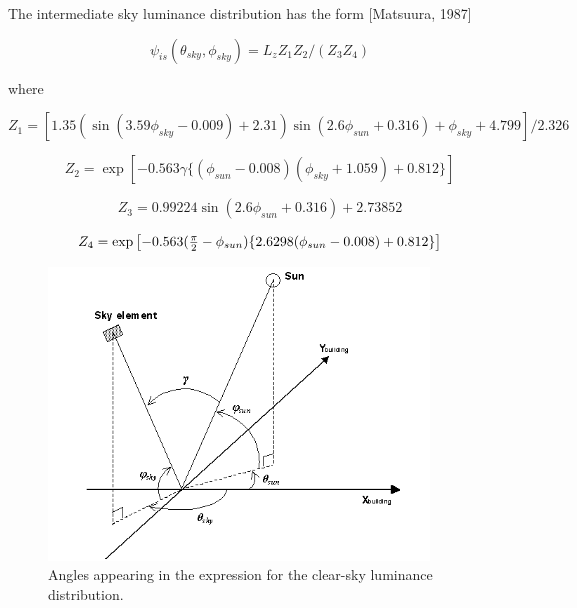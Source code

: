 The intermediate sky luminance distribution has the form {[}Matsuura, 1987{]}

\begin{equation}
{\psi_{is}}\left( {{\theta_{sky}},{\phi_{sky}}} \right) = {L_z}{Z_1}{Z_2}/({Z_3}{Z_4})
\end{equation}

where

\begin{equation}
{Z_1} = \left[ {1.35(\sin (3.59{\phi_{sky}} - 0.009) + 2.31)\sin (2.6{\phi_{sun}} + 0.316) + {\phi_{sky}} + 4.799} \right]/2.326 
\end{equation}

\begin{equation}
{Z_2} = \exp \left[ { - 0.563\gamma \{ ({\phi_{sun}} - 0.008)({\phi_{sky}} + 1.059) + 0.812\} } \right]
\end{equation}

\begin{equation}
{Z_3} = 0.99224\sin (2.6{\phi_{sun}} + 0.316) + 2.73852
\end{equation}

\begin{equation}
{Z_4} = \exp \left[ { - 0.563({\textstyle{\pi  \over 2}} - {\phi_{sun}})\{ 2.6298({\phi_{sun}} - 0.008) + 0.812\} } \right]
\end{equation}

\begin{figure}[hbtp] %
\centering
\includegraphics[width=0.9\textwidth, height=0.9\textheight, keepaspectratio=true]{media/image733.png}
\caption{  Angles appearing in the expression for the clear-sky luminance distribution. \protect \label{fig:angles-appearing-in-the-expression-for}}
\end{figure}

